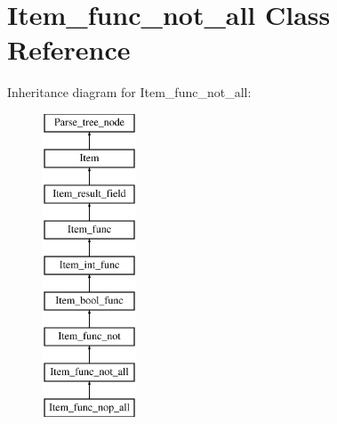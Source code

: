\hypertarget{classItem__func__not__all}{}\section{Item\+\_\+func\+\_\+not\+\_\+all Class Reference}
\label{classItem__func__not__all}
Inheritance diagram for Item\+\_\+func\+\_\+not\+\_\+all\+:\begin{figure}[H]
\begin{center}
\leavevmode
\includegraphics[height=9.000000cm]{classItem__func__not__all}
\end{center}
\end{figure}
